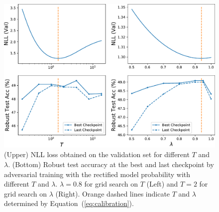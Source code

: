 \begin{figure} %
  \includegraphics[width=1.0\linewidth]{figures/method-grid-search.pdf}
  \caption{(Upper) NLL loss obtained on the validation set for different $T$ and $\lambda$. (Bottom) Robust test accuracy at the best and last checkpoint by adversarial training with the rectified model probability with different $T$ and $\lambda$. $\lambda=0.8$ for grid search on $T$ (Left) and $T=2$ for grid search on $\lambda$ (Right). Orange dashed lines indicate $T$ and $\lambda$  determined by Equation~(\ref{eq:calibration}).}%
  \label{fig:method-grid-search}
  \vspace{-2cm}
\end{figure}





